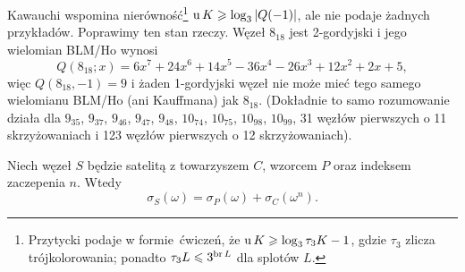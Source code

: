Kawauchi \cite[s. 151]{kawauchi1996} wspomina nierówność\footnote{Przytycki \cite[s. 198]{przytycki1995} podaje w formie ćwiczeń, że $\operatorname{u} K \geqslant \log_3 \tau_3 K - 1$, gdzie $\tau_3$ zlicza trójkolorowania; ponadto $\tau_3 L \leqslant 3^{\operatorname{br} L}$ dla splotów $L$.} $\operatorname{u} K \geqslant \log_3 |Q(-1)|$, ale nie podaje żadnych przykładów.
Poprawimy ten stan rzeczy.
Węzeł $8_{18}$ jest 2-gordyjski i jego wielomian BLM/Ho wynosi
\begin{equation}
    Q (8_{18}; x) = 6x^7 + 24x^6 + 14x^5 - 36x^4 - 26x^3 + 12x^2 + 2x + 5,
\end{equation}
więc $Q (8_{18}, -1) = 9$ i żaden 1-gordyjski węzeł nie może mieć tego samego wielomianu BLM/Ho (ani Kauffmana) jak $8_{18}$.
(Dokładnie to samo rozumowanie działa dla $9_{35}$, $9_{37}$, $9_{46}$, $9_{47}$, $9_{48}$, $10_{74}$, $10_{75}$, $10_{98}$, $10_{99}$, 31 węzłów pierwszych o 11 skrzyżowaniach i 123 węzłów pierwszych o 12 skrzyżowaniach).

\begin{proposition}
%
    Niech węzeł $S$ będzie satelitą z towarzyszem $C$, wzorcem $P$ oraz indeksem zaczepenia $n$.
    Wtedy
    \begin{equation}
        \sigma_S(\omega) = \sigma_P(\omega) + \sigma_C(\omega^n).
    \end{equation}
\end{proposition}

